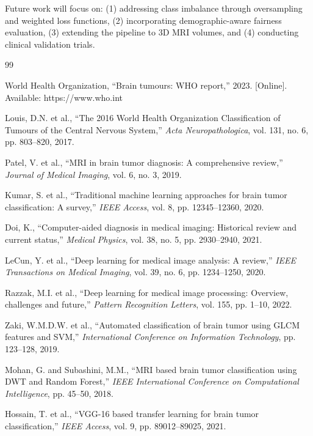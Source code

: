 \documentclass[conference]{IEEEtran}
\begin{document}
Future work will focus on: (1) addressing class imbalance through oversampling and weighted loss functions, (2) incorporating demographic-aware fairness evaluation, (3) extending the pipeline to 3D MRI volumes, and (4) conducting clinical validation trials.

\balance

\begin{thebibliography}{99}

 World Health Organization, ``Brain tumours: WHO report,'' 2023. [Online]. Available: https://www.who.int

 Louis, D.N. et al., ``The 2016 World Health Organization Classification of Tumours of the Central Nervous System,'' \textit{Acta Neuropathologica}, vol. 131, no. 6, pp. 803--820, 2017.

 Patel, V. et al., ``MRI in brain tumor diagnosis: A comprehensive review,'' \textit{Journal of Medical Imaging}, vol. 6, no. 3, 2019.

 Kumar, S. et al., ``Traditional machine learning approaches for brain tumor classification: A survey,'' \textit{IEEE Access}, vol. 8, pp. 12345--12360, 2020.

 Doi, K., ``Computer-aided diagnosis in medical imaging: Historical review and current status,'' \textit{Medical Physics}, vol. 38, no. 5, pp. 2930--2940, 2021.

 LeCun, Y. et al., ``Deep learning for medical image analysis: A review,'' \textit{IEEE Transactions on Medical Imaging}, vol. 39, no. 6, pp. 1234--1250, 2020.

 Razzak, M.I. et al., ``Deep learning for medical image processing: Overview, challenges and future,'' \textit{Pattern Recognition Letters}, vol. 155, pp. 1--10, 2022.

 Zaki, W.M.D.W. et al., ``Automated classification of brain tumor using GLCM features and SVM,'' \textit{International Conference on Information Technology}, pp. 123--128, 2019.

 Mohan, G. and Subashini, M.M., ``MRI based brain tumor classification using DWT and Random Forest,'' \textit{IEEE International Conference on Computational Intelligence}, pp. 45--50, 2018.

 Hossain, T. et al., ``VGG-16 based transfer learning for brain tumor classification,'' \textit{IEEE Access}, vol. 9, pp. 89012--89025, 2021.


\end{thebibliography}
\end{document}
